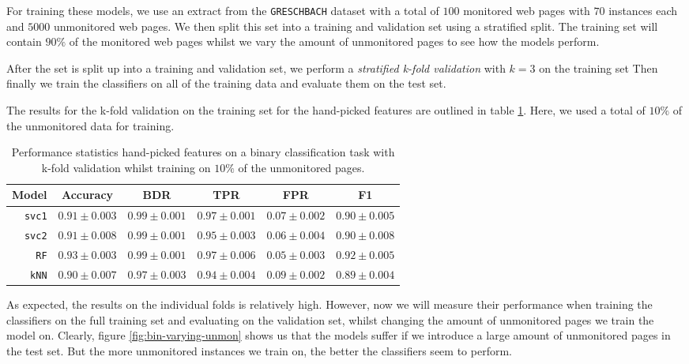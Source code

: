 For training these models, we use an extract from the \texttt{GRESCHBACH} dataset with a total of $100$ monitored web pages with $70$ instances each and $5000$ unmonitored web pages.
We then split this set into a training and validation set using a stratified split.
The training set will contain $90\%$ of the monitored web pages whilst we vary the amount of unmonitored pages to see how the models perform.

After the set is split up into a training and validation set, we perform a \textit{stratified k-fold validation} with $k = 3$ on the training set
Then finally we train the classifiers on all of the training data and evaluate them on the test set.

The results for the k-fold validation on the training set for the hand-picked features are outlined in table \ref{table:hand-picked-bin}.
Here, we used a total of $10\%$ of the unmonitored data for training.

\begin{table}[ht]
  \centering
  \begin{tabular}{ r  r  r  r  r  r } \hline
    \multicolumn{1}{c}{\textbf{Model}} & \multicolumn{1}{c}{\textbf{Accuracy}} & \multicolumn{1}{c}{\textbf{BDR}} & \multicolumn{1}{c}{\textbf{TPR}} &
      \multicolumn{1}{c}{\textbf{FPR}} & \multicolumn{1}{c}{\textbf{F1}} \\ \hline

    \texttt{svc1} & $0.91 \pm 0.003$ & $0.99 \pm 0.001$ & $0.97 \pm 0.001$ & $0.07 \pm 0.002$ & $0.90 \pm 0.005$ \\

    \texttt{svc2} & $0.91 \pm 0.008$ & $0.99 \pm 0.001$ & $0.95 \pm 0.003$ & $0.06 \pm 0.004$ & $0.90 \pm 0.008$ \\

    \texttt{RF} & $0.93 \pm 0.003$ & $0.99 \pm 0.001$ & $0.97 \pm 0.006$ & $0.05 \pm 0.003$ & $0.92 \pm 0.005$ \\

    \texttt{kNN} & $0.90 \pm 0.007$ & $0.97 \pm 0.003$ & $0.94 \pm 0.004$ & $0.09 \pm 0.002$ & $0.89 \pm 0.004$ \\

    \hline
  \end{tabular}
  \caption{Performance statistics hand-picked features on a binary classification task with k-fold validation whilst training on $10\%$ of the unmonitored pages.}
  \label{table:hand-picked-bin}
\end{table}

As expected, the results on the individual folds is relatively high.
However, now we will measure their performance when training the classifiers on the full training set and evaluating on the validation set, whilst changing the amount of unmonitored pages we train the model on.
Clearly, figure \ref{fig:bin-varying-unmon} shows us that the models suffer if we introduce a large amount of unmonitored pages in the test set.
But the more unmonitored instances we train on, the better the classifiers seem to perform.

